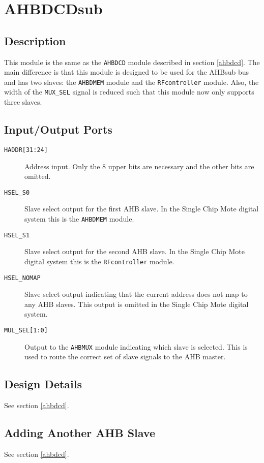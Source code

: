 \section{AHBDCDsub}
\subsection{Description}
This module is the same as the \texttt{AHBDCD} module described in section \ref{ahbdcd}. The main difference is that this module is designed to be used for the AHBsub bus and has two slaves: the \texttt{AHBDMEM} module and the \texttt{RFcontroller} module. Also, the width of the \texttt{MUX\_SEL} signal is reduced such that this module now only supports three slaves.

\subsection{Input/Output Ports}
\begin{description}
	\item[\texttt{HADDR[31:24]}] Address input. Only the 8 upper bits are necessary and the other bits are omitted.
	\item[\texttt{HSEL\_S0}] Slave select output for the first AHB slave. In the Single Chip Mote digital system this is the \texttt{AHBDMEM} module.
	\item[\texttt{HSEL\_S1}] Slave select output for the second AHB slave. In the Single Chip Mote digital system this is the \texttt{RFcontroller} module.
	\item[\texttt{HSEL\_NOMAP}] Slave select output indicating that the current address does not map to any AHB slaves. This output is omitted in the Single Chip Mote digital system.
	\item[\texttt{MUL\_SEL[1:0]}] Output to the \texttt{AHBMUX} module indicating which slave is selected. This is used to route the correct set of slave signals to the AHB master.
\end{description}

\subsection{Design Details}
See section \ref{ahbdcd}.

\subsection{Adding Another AHB Slave}
See section \ref{ahbdcd}.

